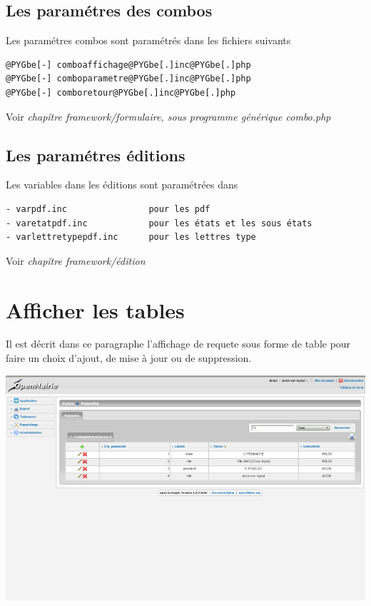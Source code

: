 \documentclass[letterpaper,10pt,french]{manual}
\begin{document}
\subsection{Les paramétres des combos}

Les paramétres combos sont paramétrés dans les fichiers suivants

\begin{Verbatim}[commandchars=@\[\]]
@PYGbe[-] comboaffichage@PYGbe[.]inc@PYGbe[.]php
@PYGbe[-] comboparametre@PYGbe[.]inc@PYGbe[.]php
@PYGbe[-] comboretour@PYGbe[.]inc@PYGbe[.]php
\end{Verbatim}

Voir \emph{chapître framework/formulaire, sous programme générique combo.php}


\subsection{Les paramétres éditions}

Les variables dans les éditions sont paramétrées dans

\begin{Verbatim}[commandchars=@\[\]]
- varpdf.inc                pour les pdf
- varetatpdf.inc            pour les états et les sous états
- varlettretypepdf.inc      pour les lettres type
\end{Verbatim}

Voir \emph{chapître framework/édition}

\resetcurrentobjects
\hypertarget{--doc-framework/affichage}{}

\hypertarget{affichage}{}\section{Afficher les tables}

Il est décrit dans ce paragraphe l'affichage de requete sous forme de table
pour faire un choix d'ajout, de mise à jour ou de suppression.

\includegraphics{tab_1.png}
\end{document}
